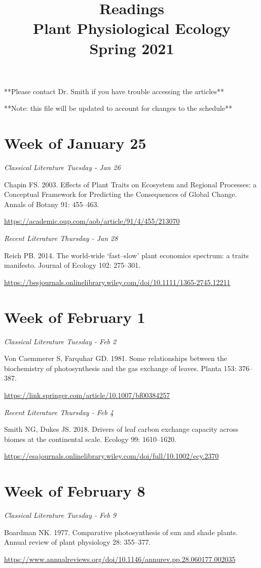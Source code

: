 \documentclass[12pt, notitlepage]{article}   	%
\title{
	\textbf{
		Readings
	} \\
	\large Plant Physiological Ecology \\
	\large Spring 2021
}
\date{\vspace{-5ex}}
\begin{document}
{\selectfont %

\maketitle

**Please contact Dr. Smith if you have trouble accessing the articles**

**Note: this file will be updated to account for changes to the schedule**

\section*{Week of January 25}
\textit{Classical Literature Tuesday - Jan 26} \par
Chapin FS. 2003. Effects of Plant Traits on Ecosystem and Regional Processes: 
a Conceptual Framework for Predicting the Consequences of Global Change. 
Annals of Botany 91: 455–463. \par
\url{https://academic.oup.com/aob/article/91/4/455/213070}

\textit{Recent Literature Thursday - Jan 28} \par
Reich PB. 2014. The world-wide ‘fast–slow’ plant economics spectrum: a traits manifesto. 
Journal of Ecology 102: 275–301. \par
\url{https://besjournals.onlinelibrary.wiley.com/doi/10.1111/1365-2745.12211}
\par

\section*{Week of February 1}
\textit{Classical Literature Tuesday - Feb 2} \par
Von Caemmerer S, Farquhar GD. 1981. Some relationships between the biochemistry of 
photosynthesis and the gas exchange of leaves. Planta 153: 376–387. \par
\url{https://link.springer.com/article/10.1007/bf00384257}

\textit{Recent Literature Thursday - Feb 4} \par
Smith NG, Dukes JS. 2018. Drivers of leaf carbon exchange capacity across biomes at 
the continental scale. Ecology 99: 1610–1620. \par
\url{https://esajournals.onlinelibrary.wiley.com/doi/full/10.1002/ecy.2370}

\section*{Week of February 8}
\textit{Classical Literature Tuesday - Feb 9} \par
Boardman NK. 1977. Comparative photosynthesis of sun and shade plants. 
Annual review of plant physiology 28: 355–377. \par
\url{https://www.annualreviews.org/doi/10.1146/annurev.pp.28.060177.002035}

}
\end{document}
